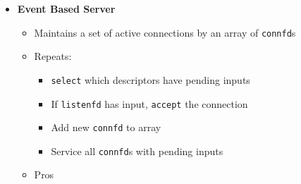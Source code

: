 \documentclass[12pt]{article}
\begin{document}
{\begin{itemize}
\begin{itemize}
		\begin{enumerate}
			\item Server blocks in \texttt{accept}, waits for connection request on \texttt{listenfd}
			\item Client makes connection request by \texttt{connect}
			\item Server returns \texttt{connfd} from \texttt{accept}, \textit{Forks child to handle client}
			\item Connection between \texttt{clientfd} and \texttt{connfd} is established  
		\end{enumerate}
		\item \textit{No shared states between clients}
		\item Both parent \& child have copies of \texttt{listenfd} and \texttt{connfd}: parent should close \texttt{connfd}, child should close \texttt{listenfd} (considering \texttt{refcnt})
		\item Pros
		\begin{itemize}
			\item Clean sharing model - file tables (o), descriptors/global var.(x)
			\item Simple and straightforward
		\end{itemize}
		\item Cons
		\begin{itemize}
			\item Additional overhead for process control
			\item Hard to share data between processes (IPC)
		\end{itemize}
	\end{itemize}
	\item \textbf{Event Based Server}
	\begin{itemize}
		\item Maintains a set of active connections by an array of \texttt{connfd}s
		\item Repeats:
		\begin{itemize}
			\item \texttt{select} which descriptors have pending inputs
			\item If \texttt{listenfd} has input, \texttt{accept} the connection
			\item Add new \texttt{connfd} to array
			\item Service all \texttt{connfd}s with pending inputs
		\end{itemize}
		\item Pros
		\begin{itemize}

\end{itemize}
\end{itemize}
\end{itemize}}
\end{document}
